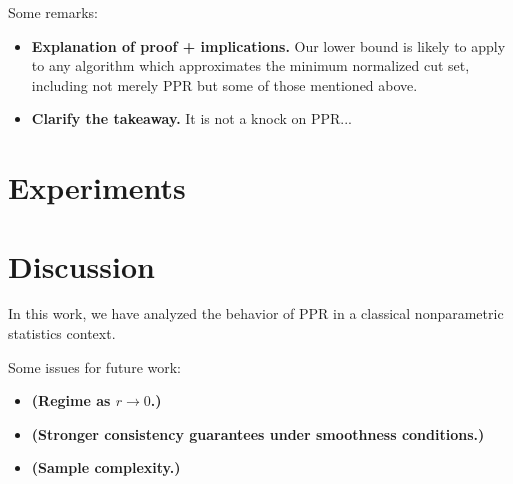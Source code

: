 \documentclass{article}
\newcommand{\1}{\mathbf{1}}
\theoremstyle{alden}
\theoremstyle{aldenthm}
\theoremstyle{definition}
\theoremstyle{remark}
\begin{document}
Some remarks:
\begin{itemize}
	\item \textbf{Explanation of proof + implications.} Our lower bound is likely to apply to any algorithm which approximates the minimum normalized cut set, including not merely PPR but some of those mentioned above.
	\item \textbf{Clarify the takeaway.} It is not a knock on PPR...
\end{itemize}

\section{Experiments}

\section{Discussion}
In this work, we have analyzed the behavior of PPR in a classical nonparametric statistics context.

Some issues for future work:
\begin{itemize}
	\item \textbf{(Regime as $r \to 0$.)}
	\item \textbf{(Stronger consistency guarantees under smoothness conditions.)}
	\item \textbf{(Sample complexity.)}
\end{itemize}
	
\end{document}
